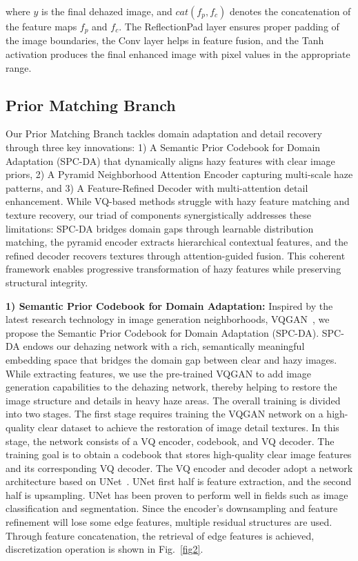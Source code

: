 \documentclass[journal]{IEEEtran}
\begin{document}
where $y$ is the final dehazed image, and $cat(f_{p}, f_{c})$ denotes the concatenation of the feature maps $f_{p}$ and $f_{c}$. The ReflectionPad layer ensures proper padding of the image boundaries, the Conv layer helps in feature fusion, and the Tanh activation produces the final enhanced image with pixel values in the appropriate range.

\subsection{Prior Matching Branch}
Our Prior Matching Branch tackles domain adaptation and detail recovery through three key innovations: 1) A Semantic Prior Codebook for Domain Adaptation (SPC-DA) that dynamically aligns hazy features with clear image priors, 2) A Pyramid Neighborhood Attention Encoder capturing multi-scale haze patterns, and 3) A Feature-Refined Decoder with multi-attention detail enhancement. While VQ-based methods struggle with hazy feature matching and texture recovery, our triad of components synergistically addresses these limitations: SPC-DA bridges domain gaps through learnable distribution matching, the pyramid encoder extracts hierarchical contextual features, and the refined decoder recovers textures through attention-guided fusion. This coherent framework enables progressive transformation of hazy features while preserving structural integrity.

	{\bf{1) Semantic Prior Codebook for Domain Adaptation:}} Inspired by the latest research technology in image generation neighborhoods, VQGAN~\cite{esser2021taming}, we propose the Semantic Prior Codebook for Domain Adaptation (SPC-DA). SPC-DA endows our dehazing network with a rich, semantically meaningful embedding space that bridges the domain gap between clear and hazy images. While extracting features, we use the pre-trained VQGAN to add image generation capabilities to the dehazing network, thereby helping to restore the image structure and details in heavy haze areas. The overall training is divided into two stages. The first stage requires training the VQGAN network on a high-quality clear dataset to achieve the restoration of image detail textures. In this stage, the network consists of a VQ encoder, codebook, and VQ decoder. The training goal is to obtain a codebook that stores high-quality clear image features and its corresponding VQ decoder. The VQ encoder and decoder adopt a network architecture based on UNet~\cite{ronneberger2015u}. UNet first half is feature extraction, and the second half is upsampling. UNet has been proven to perform well in fields such as image classification and segmentation. Since the encoder's downsampling and feature refinement will lose some edge features, multiple residual structures are used. Through feature concatenation, the retrieval of edge features is achieved, discretization operation is shown in Fig.~\ref{fig2}.
\end{document}
